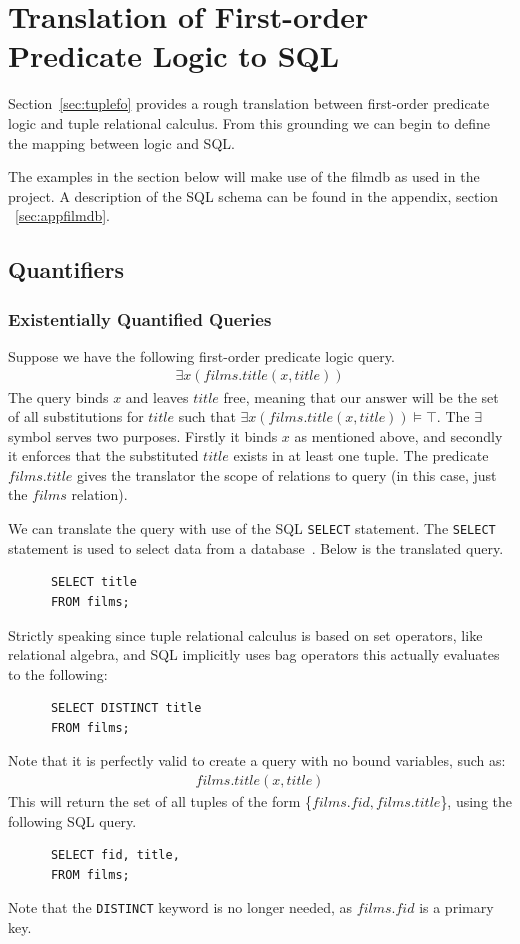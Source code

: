 \documentclass[a4paper, 11pt]{article}
\begin{document}
\section{Translation of First-order Predicate Logic to SQL}
  Section~\ref{sec:tuplefo} provides a rough translation between first-order
  predicate logic and tuple relational calculus. From this grounding we can
  begin to define the mapping between logic and SQL.

  The examples in the section below will make use of the filmdb as used in the
  project. A description of the SQL schema can be found in the appendix,
  section ~\ref{sec:appfilmdb}.

  \subsection{Quantifiers}
    \subsubsection{Existentially Quantified Queries}
      Suppose we have the following first-order predicate logic query.
      \begin{gather}
        \exists x(films.title(x, title)) \label{select1}
      \end{gather}
      The query binds $x$ and leaves $title$ free, meaning that our
      answer will be the set of all substitutions for $title$ such that
      $\exists x(films.title(x, title)) \models \top$. The $\exists$ symbol
      serves two purposes. Firstly it binds $x$ as mentioned above, and secondly
      it enforces that the substituted $title$ exists in at least one tuple.
      The predicate $films.title$ gives the translator the scope of
      relations to query (in this case, just the $films$ relation).

      We can translate the query with use of the SQL \texttt{SELECT} statement.
      The \texttt{SELECT} statement is used to select data from a
      database~\cite{w3SELECT}. Below is the translated query.
      \begin{verbatim}
      SELECT title
      FROM films;
      \end{verbatim}
      Strictly speaking since tuple relational calculus is based on set
      operators, like relational algebra, and SQL implicitly uses bag operators
      this actually evaluates to the following:
      \begin{verbatim}
      SELECT DISTINCT title
      FROM films;
      \end{verbatim}
      Note that it is perfectly valid to create a query with no bound variables,
      such as:
      \begin{gather}
        films.title(x, title) \label{select2}
      \end{gather}
      This will return the set of all tuples of the form \{$films.fid,
      films.title$\}, using the following SQL query.
      \begin{verbatim}
      SELECT fid, title,
      FROM films;
      \end{verbatim}
      Note that the \texttt{DISTINCT} keyword is no longer needed, as $films.fid$
      is a primary key.
\end{document}
